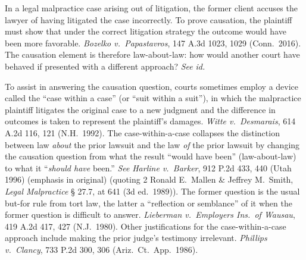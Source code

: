 \documentclass[
  12pt,
  letterpaper,
]{scrartcl}
\begin{document}
In a legal malpractice case arising out of litigation, the former client
accuses the lawyer of having litigated the case incorrectly. To prove
causation, the plaintiff must show that under the correct litigation strategy the
outcome would have been more favorable. \textit{Bozelko v.~Papastavros}, 147
A.3d 1023, 1029 (Conn.~2016). The causation element is therefore law-about-law:
how would another court have behaved if presented with a different approach? \textit{See} \textit{id.}

To assist in answering the causation question, courts sometimes employ a device called the ``case within a
case'' (or ``suit within a suit''), in which the malpractice plaintiff
litigates the original case to a new judgment and the difference in outcomes is
taken to represent the plaintiff's damages. \textit{Witte v.~Desmarais}, 614
A.2d 116, 121 (N.H.~1992). The case-within-a-case collapses the distinction
between law \textit{about} the prior lawsuit and the law \textit{of} the prior
lawsuit by changing the causation question from what the result ``would have
been'' (law-about-law) to what it ``\textit{should have} been.'' \textit{See}
\textit{Harline v.~Barker}, 912 P.2d 433, 440 (Utah 1996) (emphasis in
original) (quoting 2 Ronald E.~Mallen \& Jeffrey M.~Smith, \textit{Legal
Malpractice} § 27.7, at 641 (3d ed.~1989)). The former question is the usual but-for rule
from tort law, the latter a ``reflection or semblance'' of it when the former
question is difficult to answer. \textit{Lieberman v.~Employers Ins.~of
Wausau}, 419 A.2d 417, 427 (N.J.~1980). Other justifications for the
case-within-a-case approach include making the prior judge's testimony
irrelevant. \textit{Phillips v.~Clancy}, 733 P.2d 300, 306
(Ariz.~Ct.~App.~1986).
\end{document}
